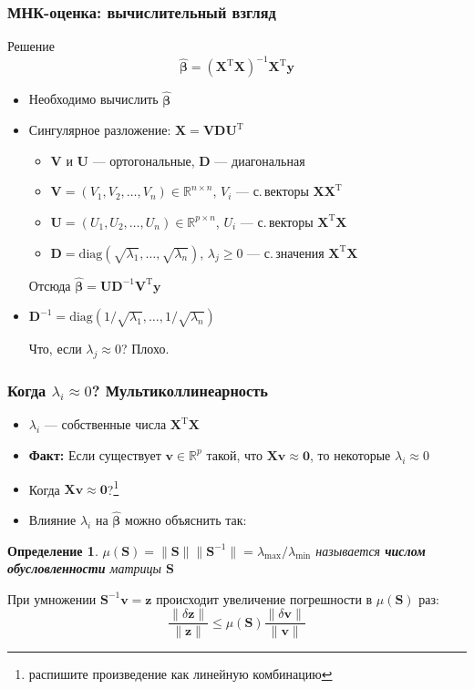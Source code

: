\documentclass[ucs, notheorems, handout]{beamer}
\newcommand{\betah}{\hat{\bm \beta}}
\newcommand{\XT}{{\bm{X}}^{\mathrm{T}}}
\newcommand{\X}{\bm{X}}
\newtheorem{definition}{Определение}
\begin{document}
\begin{frame}
    \frametitle{МНК-оценка: вычислительный взгляд}

\begin{block}{Решение}
$$\betah = (\X^\mathrm{T}\X)^{-1} \X^\mathrm{T} \bm y$$
\end{block}	

\begin{itemize}
\item Необходимо вычислить $\betah$
\item Сингулярное разложение: $\X = \bm V \bm D \bm U^\mathrm T$
\begin{itemize}
\item $\bm V$ и $\bm U$ --- ортогональные, $\bm D$ --- диагональная
\item $\bm V = (V_1, V_2, \ldots, V_n) \in \mathbb R^{n\times n}$, $V_i$ --- с.\,векторы $\X \XT$
\item $\bm U = (U_1, U_2, \ldots, U_n) \in \mathbb R^{p\times n}$, $U_i$ --- с.\,векторы $\XT \X$
\item $\bm D = \mathrm{diag}(\sqrt{\lambda_1}, \ldots,\sqrt{\lambda_n})$, $\lambda_j \geqslant 0$ --- с.\,значения $\XT \X$
\end{itemize}

Отсюда $\betah = \bm U \bm D^{-1} \bm V^\mathrm T\bm y$
\item $\bm D^{-1} = \mathrm{diag} (1/\sqrt{\lambda_1}, \ldots, 1/\sqrt{\lambda_n})$ 
\begin{alertblock}{Что, если $\lambda_j \approx 0$?}
Плохо.
\end{alertblock}
\end{itemize}
    \note{

    }
\end{frame}


\begin{frame}
    \frametitle{Когда $\lambda_i \approx 0$? Мультиколлинеарность}

\begin{itemize}
	\item $\lambda_i$ --- собственные числа $\XT \X$
	\item \textbf{Факт:} Если существует $\bm v \in \mathbb R^p$ такой, что $\X \bm v \approx \bm 0$, то некоторые $\lambda_i \approx 0$
	\item Когда $\X \bm v \approx \bm 0$?\footnote{распишите произведение как линейную комбинацию} {\color{gray}{ Происходит ли такое на практике?}}
	\item Влияние $\lambda_i$ на $\betah$ можно объяснить так:
\end{itemize}

\begin{definition}
$\mu(\bm S) = \|\bm S\|\|\bm S^{-1}\| = {\lambda_{\text{max}}}/{\lambda_{\text{min}}}$ называется \textbf{числом обусловленности} матрицы $\bm S$
\end{definition}

При умножении $\bm S^{-1}\bm v = \bm z$ происходит увеличение погрешности в $\mu(\bm S)$ раз:
$$
\frac{\|\delta \bm z\|}{\|\bm z\|} \leqslant \mu(\bm S) \frac{\|\delta \bm v\|}{\|\bm v\|}
$$
    \note{

    }
\end{frame}
\end{document}
